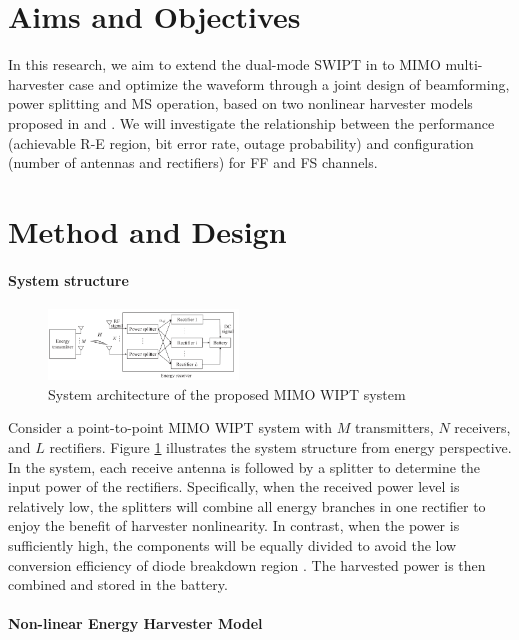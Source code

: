 \documentclass[conference]{IEEEtran}
\begin{document}
\section{Aims and Objectives}
In this research, we aim to extend the dual-mode SWIPT in \cite{Park2018} to MIMO multi-harvester case and optimize the waveform through a joint design of beamforming, power splitting and MS operation, based on two nonlinear harvester models proposed in \cite{Boshkovska2015} and \cite{Clerckx2016}. We will investigate the relationship between the performance (achievable R-E region, bit error rate, outage probability) and configuration (number of antennas and rectifiers) for FF and FS channels.

\section{Method and Design}

\paragraph{System structure}

\begin{figure}
  \centering
    \includegraphics[width=0.45\textwidth]{system_architecture}
  \caption{System architecture of the proposed MIMO WIPT system \cite{Ma2019}}
  \label{fig:system_architecture}
\end{figure}

Consider a point-to-point MIMO WIPT system with $M$ transmitters, $N$ receivers, and $L$ rectifiers. Figure \ref{fig:system_architecture} illustrates the system structure from energy perspective. In the system, each receive antenna is followed by a splitter to determine the input power of the rectifiers. Specifically, when the received power level is relatively low, the splitters will combine all energy branches in one rectifier to enjoy the benefit of harvester nonlinearity. In contrast, when the power is sufficiently high, the components will be equally divided to avoid the low conversion efficiency of diode breakdown region \cite{Clerckx2019}. The harvested power is then combined and stored in the battery.

\paragraph{Non-linear Energy Harvester Model}
\end{document}
